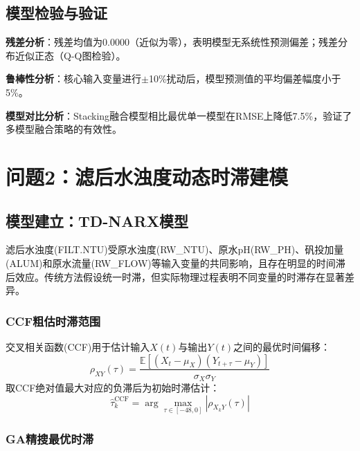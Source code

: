 \documentclass[12pt,a4paper]{ctexart}
\begin{document}
\subsection{模型检验与验证}

\textbf{残差分析}：残差均值为0.0000（近似为零），表明模型无系统性预测偏差；残差分布近似正态（Q-Q图检验）。

\textbf{鲁棒性分析}：核心输入变量进行$\pm$10\%扰动后，模型预测值的平均偏差幅度小于5\%。

\textbf{模型对比分析}：Stacking融合模型相比最优单一模型在RMSE上降低7.5\%，验证了多模型融合策略的有效性。

\newpage

\section{问题2：滤后水浊度动态时滞建模}

\subsection{模型建立：TD-NARX模型}

滤后水浊度(FILT.NTU)受原水浊度(RW\_NTU)、原水pH(RW\_PH)、矾投加量(ALUM)和原水流量(RW\_FLOW)等输入变量的共同影响，且存在明显的时间滞后效应。传统方法假设统一时滞，但实际物理过程表明不同变量的时滞存在显著差异。

\subsubsection{CCF粗估时滞范围}

交叉相关函数(CCF)用于估计输入$X(t)$与输出$Y(t)$之间的最优时间偏移：
\begin{equation}
\rho_{XY}(\tau) = \frac{\mathbb{E}[(X_t - \mu_X)(Y_{t+\tau} - \mu_Y)]}{\sigma_X \sigma_Y}
\label{eq:ccf}
\end{equation}
取CCF绝对值最大对应的负滞后为初始时滞估计：
\begin{equation}
\hat{\tau}_k^{\text{CCF}} = \arg\max_{\tau \in [-48, 0]} |\rho_{X_k Y}(\tau)|
\label{eq:ccf_est}
\end{equation}

\subsubsection{GA精搜最优时滞}
\end{document}
